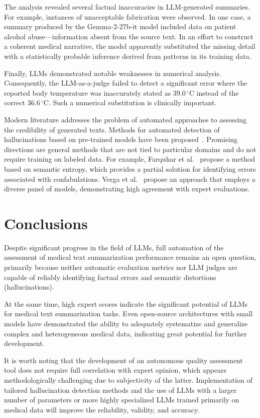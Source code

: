 \documentclass[runningheads]{llncs}
\begin{document}
The analysis revealed several factual inaccuracies in LLM-generated summaries. For example, instances of unacceptable fabrication were observed. In one case, a summary produced by the Gemma-2-27b-it model included data on patient alcohol abuse---information absent from the source text. In an effort to construct a coherent medical narrative, the model apparently substituted the missing detail with a statistically probable inference derived from patterns in its training data.

Finally, LLMs demonstrated notable weaknesses in numerical analysis. Consequently, the LLM-as-a-judge failed to detect a significant error where the reported body temperature was inaccurately stated as $39.0\,^\circ\mathrm{C}$ instead of the correct $36.6\,^\circ\mathrm{C}$. Such a numerical substitution is clinically important.

Modern literature addresses the problem of automated approaches to assessing the credibility of generated texts. Methods for automated detection of hallucinations based on pre-trained models have been proposed~\cite{urlana2025,park2025}. Promising directions are general methods that are not tied to particular domains and do not require training on labeled data. For example, Farquhar et al.~\cite{farquhar2024} propose a method based on semantic entropy, which provides a partial solution for identifying errors associated with confabulations. Verga et al.~\cite{verga2024} propose an approach that employs a diverse panel of models, demonstrating high agreement with expert evaluations.

\section{Conclusions}\label{sec:conclusions}

Despite significant progress in the field of LLMs, full automation of the assessment of medical text summarization performance remains an open question, primarily because neither automatic evaluation metrics nor LLM judges are capable of reliably identifying factual errors and semantic distortions (hallucinations).

At the same time, high expert scores indicate the significant potential of LLMs for medical text summarization tasks. Even open-source architectures with small models have demonstrated the ability to adequately systematize and generalize complex and heterogeneous medical data, indicating great potential for further development.

It is worth noting that the development of an autonomous quality assessment tool does not require full correlation with expert opinion, which appears methodologically challenging due to subjectivity of the latter. Implementation of tailored hallucination detection methods and the use of LLMs with a larger number of parameters or more highly specialized LLMs trained primarily on medical data will improve the reliability, validity, and accuracy.
\end{document}
